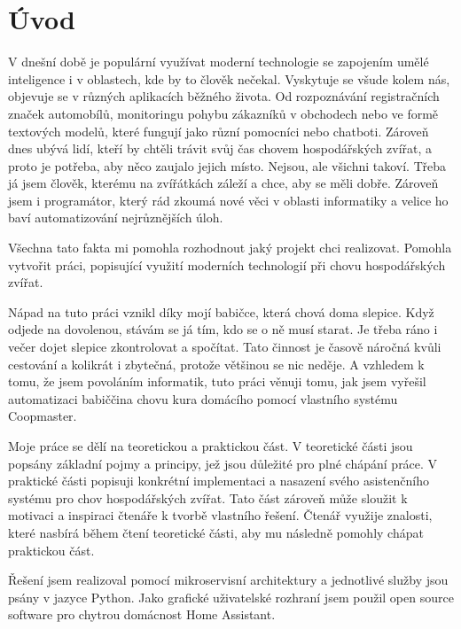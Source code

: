 \chapter{Úvod}\label{ch:uvod}

V dnešní době je populární využívat moderní technologie se zapojením umělé inteligence i v oblastech, kde by to člověk nečekal.
Vyskytuje se všude kolem nás, objevuje se v různých aplikacích běžného života.
Od rozpoznávání registračních značek automobílů, monitoringu pohybu zákazníků v obchodech nebo ve formě textových modelů, které fungují jako různí pomocníci nebo chatboti.
Zároveň dnes ubývá lidí, kteří by chtěli trávit svůj čas chovem hospodářských zvířat, a proto je potřeba, aby něco zaujalo jejich místo.
Nejsou, ale všichni takoví.
Třeba já jsem člověk, kterému na zvířátkách záleží a chce, aby se měli dobře.
Zároveň jsem i programátor, který rád zkoumá nové věci v oblasti informatiky a velice ho baví automatizování nejrůznějších úloh.

Všechna tato fakta mi pomohla rozhodnout jaký projekt chci realizovat.
Pomohla vytvořit práci, popisující využití moderních technologií při chovu hospodářských zvířat.

Nápad na tuto práci vznikl díky mojí babičce, která chová doma slepice.
Když odjede na dovolenou, stávám se já tím, kdo se o ně musí starat.
Je třeba ráno i večer dojet slepice zkontrolovat a spočítat.
Tato činnost je časově náročná kvůli cestování a kolikrát i zbytečná, protože většinou se nic neděje.
A vzhledem k tomu, že jsem povoláním informatik, tuto práci věnuji tomu, jak jsem vyřešil automatizaci babiččina chovu kura domácího pomocí vlastního systému Coopmaster.\newline

Moje práce se dělí na teoretickou a praktickou část.
V teoretické části jsou popsány základní pojmy a principy, jež jsou důležité pro plné chápání práce.
V praktické části popisuji konkrétní implementaci a nasazení svého asistenčního systému pro chov hospodářských zvířat.
Tato část zároveň může sloužit k motivaci a inspiraci čtenáře k tvorbě vlastního řešení.
Čtenář využije znalosti, které nasbírá během čtení teoretické části, aby mu následně pomohly chápat praktickou část.\newline

Řešení jsem realizoval pomocí mikroservisní architektury a jednotlivé služby jsou psány v jazyce Python.
Jako grafické uživatelské rozhraní jsem použil open source software pro chytrou domácnost Home Assistant.
